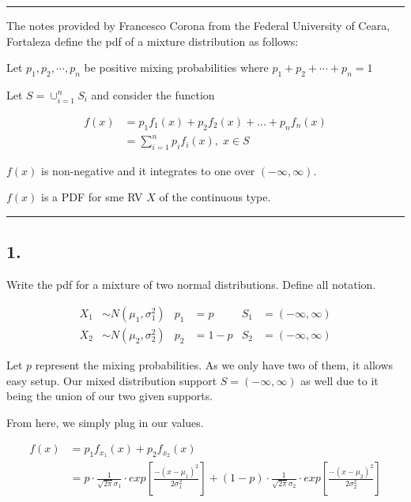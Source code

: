 \hrule
\vspace{1cm}
\noindent The notes provided by Francesco Corona from the Federal University of Ceara, Fortaleza define the pdf of a mixture distribution as follows:

Let $p_1, p_2, \cdots, p_n$ be positive mixing probabilities where $p_1 + p_2 + \cdots + p_n = 1$

Let $S = \cup_{i=1}^n S_i$ and consider the function

\begin{align*}
	f(x) &= p_1f_1(x) + p_2f_2(x) + \ldots + p_nf_n(x) \\
	&= \sum_{i=1}^n p_if_i(x), \; x \in S
\end{align*}

$f(x)$ is non-negative and it integrates to one over $(-\infty,\infty)$.

$f(x)$ is a PDF for sme RV $X$ of the continuous type.
\vspace{1cm}
\hrule
\vspace{1cm}

\subsection*{1.}

Write the pdf for a mixture of two normal distributions. Define all notation.

\begin{align*}
	X_1 &\sim N(\mu_1, \sigma^2_1) & p_1 &= p & S_1 &= (-\infty, \infty) \\
	X_2 &\sim N(\mu_2, \sigma^2_2) & p_2 &= 1-p & S_2 &= (-\infty, \infty)
\end{align*}

Let $p$ represent the mixing probabilities. As we only have two of them, it allows easy setup. Our mixed distribution support $S = (-\infty, \infty)$ as well due to it being the union of our two given supports.

From here, we simply plug in our values.

\begin{align*}
	f(x) &= p_1f_{x_1}(x) + p_2f_{x_2}(x) \\
	&= p \cdot \frac{1}{\sqrt{2\pi}\sigma_1} \cdot exp\left[ \frac{-(x-\mu_1)^2}{2\sigma^2_1} \right] + 
		(1 - p) \cdot \frac{1}{\sqrt{2\pi}\sigma_2} \cdot exp\left[ \frac{-(x-\mu_2)^2}{2\sigma^2_2}\right]
\end{align*}
